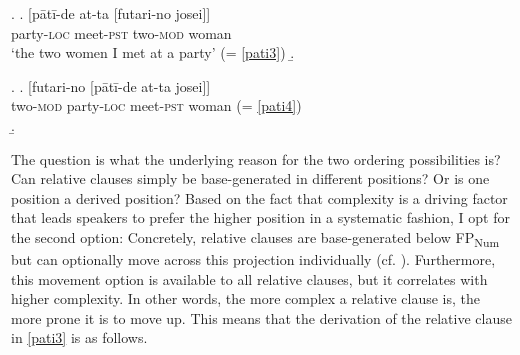 \documentclass [output=book,colorlinks,citecolor=brown]{langscibook}
\begin{document}
\ex. \ag. [pātī-de at-ta [futari-no josei]]\\
party-\textsc{loc} meet-\textsc{pst} two-\textsc{mod} woman\\
`the two women I met at a party’ \null \hfill (= \ref{pati3})
\b. 

\newpage

\ex. \ag. [futari-no [pātī-de at-ta josei]]\\
two-\textsc{mod} party-\textsc{loc} meet-\textsc{pst} woman (= \ref{pati4})\\
\b. 

The question is what the underlying reason for the two ordering possibilities is? Can relative clauses simply be base-generated in different positions? Or is one position a derived position? Based on the fact that complexity is a driving factor that leads speakers to prefer the higher position in a systematic fashion, I opt for the second option: Concretely, relative clauses are base-generated below FP\textsubscript{Num} but can optionally move across this projection individually (cf. \citealt{laenzlinger:2011:elements, kim:2019:syntax}). Furthermore, this movement option is available to all relative clauses, but it correlates with higher complexity. In other words, the more complex a relative clause is, the more prone it is to move up. This means that the derivation of the relative clause in \ref{pati3} is as follows.
\end{document}
